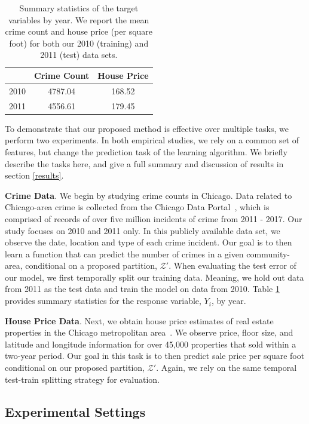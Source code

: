 \begin{center}
\begin{table}[h!]
\begin{tabular}{|c|c|c|} 
 \hline
  & Crime Count & House Price \\
 \hline
 2010 & 4787.04 & 168.52  \\
  \hline
 2011 & 4556.61 & 179.45  \\
 \hline
\end{tabular}
\caption{Summary statistics of the target variables by year. We report the mean crime count and house price (per square foot) for both our 2010 (training) and 2011 (test) data sets.}
\label{summaryStatsY}
\end{table}
\end{center}

To demonstrate that our proposed method is effective over multiple tasks, we perform two experiments. In both empirical studies, we rely on a common set of features, but change the prediction task of the learning algorithm. We briefly describe the tasks here, and give a full summary and discussion of results in section \ref{results}. 

\textbf{Crime Data}. We begin by studying crime counts in Chicago. Data related to Chicago-area crime is collected from the Chicago Data Portal~\cite{data-crime}, which is comprised of records of over five million incidents of crime from 2011 - 2017. Our study focuses on 2010 and 2011 only. In this publicly available data set, we observe the date, location and type of each crime incident. Our goal is to then learn a function that can predict the number of crimes in a given community-area, conditional on a proposed partition, $\mathcal{Z}'$. When evaluating the test error of our model, we first temporally split our training data. Meaning, we hold out data from 2011 as the test data and train the model on data from 2010. Table \ref{summaryStatsY} provides summary statistics for the response variable, $Y_i$, by year.

\textbf{House Price Data}. Next, we obtain house price estimates of real estate properties in the Chicago metropolitan area~\cite{data-houseprice}. We observe price, floor size, and latitude and longitude information for over 45,000 properties that sold within a two-year period. Our goal in this task is to then predict sale price per square foot conditional on our proposed partition, $\mathcal{Z}'$. Again, we rely on the same temporal test-train splitting strategy for evaluation.

\subsection{Experimental Settings}
